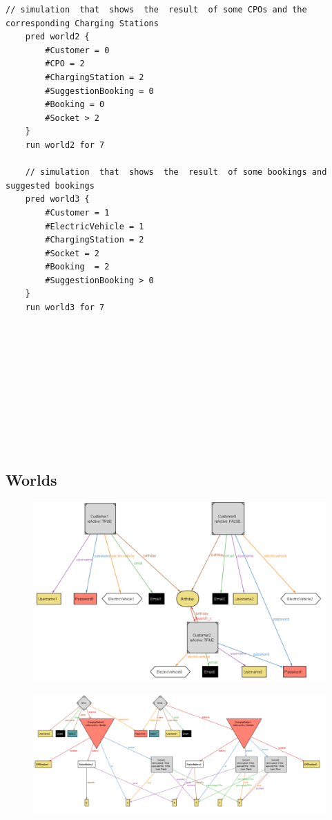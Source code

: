 \begin{lstlisting}[language=alloy]
 	// simulation  that  shows  the  result  of some CPOs and the corresponding Charging Stations
 	pred world2 {
		#Customer = 0
		#CPO = 2
		#ChargingStation = 2
		#SuggestionBooking = 0
		#Booking = 0
		#Socket > 2
 	}
 	run world2 for 7

 	// simulation  that  shows  the  result  of some bookings and suggested bookings
 	pred world3 {
		#Customer = 1
		#ElectricVehicle = 1
		#ChargingStation = 2
		#Socket = 2
		#Booking  = 2
		#SuggestionBooking > 0
 	}
 	run world3 for 7









    
\end{lstlisting}
\begin{landscape}
    \subsection{Worlds}
        \begin{figure}[H]
            \includegraphics[width=1.4\textwidth]{img/world1.pdf}
        \end{figure}
    \begin{figure}[H]
        \includegraphics[width=1.7\textwidth]{img/world2.pdf}

\end{figure}
\end{landscape}
